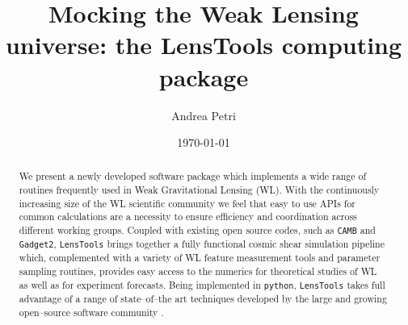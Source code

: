 \documentclass[reprint,aps,prd,superscriptaddress,showkeys,showpacs]{revtex4-1}
\newcommand{\ttt}[1]{\texttt{#1}}
\newcommand{\LT}{\texttt{LensTools} }
\begin{document}
\title{Mocking the Weak Lensing universe: the LensTools computing package}

\author{Andrea Petri}

\date{\today}

\label{firstpage}

\begin{abstract}
We present a newly developed software package which implements a wide range of routines frequently used in Weak Gravitational Lensing (WL). With the continuously increasing size of the WL scientific community we feel that easy to use APIs for common calculations are a necessity to ensure efficiency and coordination across different working groups. Coupled with existing open source codes, such as \ttt{CAMB}\citep{CAMB} and \ttt{Gadget2}\citep{Gadget2}, \LT brings together a fully functional cosmic shear simulation pipeline which, complemented with a variety of WL feature measurement tools and parameter sampling routines, provides easy access to the numerics for theoretical studies of WL as well as for experiment forecasts. Being implemented in \ttt{python}\citep{python}, \LT takes full advantage of a range of state--of--the art techniques developed by the large and growing open--source software community \citep{scipy,pandas,astropy}.    
    
\end{abstract}



\maketitle


\end{document}

